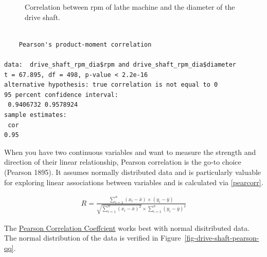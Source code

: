 \documentclass[
  a4paper,
]{scrbook}
\begin{document}
\begin{figure}[ht]


\caption{\label{fig-drive-shaft-corr-pear}Correlation between rpm of
lathe machine and the diameter of the drive shaft.}

\end{figure}%

\begin{verbatim}

    Pearson's product-moment correlation

data:  drive_shaft_rpm_dia$rpm and drive_shaft_rpm_dia$diameter
t = 67.895, df = 498, p-value < 2.2e-16
alternative hypothesis: true correlation is not equal to 0
95 percent confidence interval:
 0.9406732 0.9578924
sample estimates:
 cor 
0.95 
\end{verbatim}

When you have two continuous variables and want to measure the strength
and direction of their linear relationship, Pearson correlation is the
go-to choice (Pearson 1895). It assumes normally distributed data and is
particularly valuable for exploring linear associations between
variables and is calculated via \eqref{pearcorr}.

\begin{align}
R = \frac{\sum_{i = 1}^{n}(x_i - \bar{x}) \times (y_i - \bar{y})}{\sqrt{\sum_{i=1}^{n}(x_i-\bar{x})^2}\times \sum_{i=1}^{n}(y_i-\bar{y})^2} \label{pearcorr}
\end{align}

The \hyperref[PCC]{Pearson Correlation Coeffcient} works best with
normal disitributed data. The normal distribution of the data is
verified in Figure~\ref{fig-drive-shaft-pearson-qq}.
\end{document}
